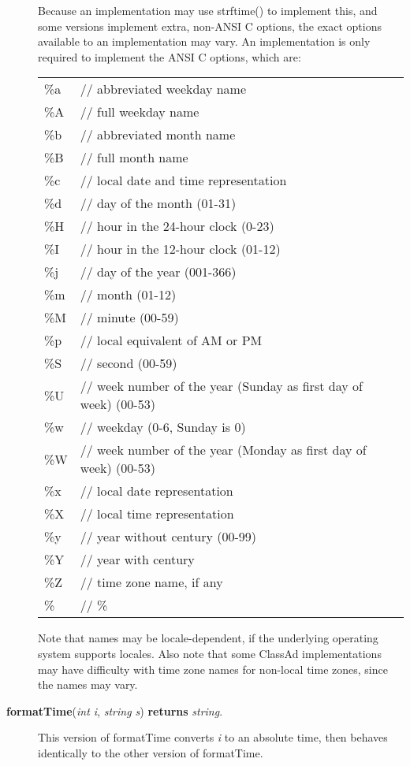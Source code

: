 \documentclass{article}
\begin{document}
\begin{description}
Because an implementation may use strftime() to implement this, and
some versions implement extra, non-ANSI C options, the exact options
available to an implementation may vary. An implementation is only
required to implement the ANSI C options, which are:

\begin{tabular}{ll}
\%a & // abbreviated weekday name \\
\%A & // full weekday name \\
\%b & // abbreviated month name \\
\%B & // full month name \\
\%c & // local date and time representation\\
\%d & // day of the month (01-31)\\
\%H & // hour in the 24-hour clock (0-23)\\
\%I & // hour in the 12-hour clock (01-12)\\
\%j & // day of the year (001-366)\\
\%m & // month (01-12)\\
\%M & // minute (00-59)\\
\%p & // local equivalent of AM or PM\\
\%S & // second (00-59)\\
\%U & // week number of the year (Sunday as first day of week) (00-53)\\
\%w & // weekday (0-6, Sunday is 0)\\
\%W & // week number of the year (Monday as first day of week) (00-53)\\
\%x & // local date representation\\
\%X & // local time representation\\
\%y & // year without century (00-99)\\
\%Y & // year with century\\
\%Z & // time zone name, if any\\
\% & // \%\\
\end{tabular}

Note that names may be locale-dependent, if the underlying operating
system supports locales. Also note that some ClassAd implementations
may have difficulty with time zone names for non-local time zones,
since the names may vary.

\item[\textbf{formatTime}(\emph{int i}, \emph{string s})
\textbf{returns} \emph{string}.]

This version of formatTime converts \emph{i} to an absolute time, then
behaves identically to the other version of formatTime.


\end{description}
\end{document}
